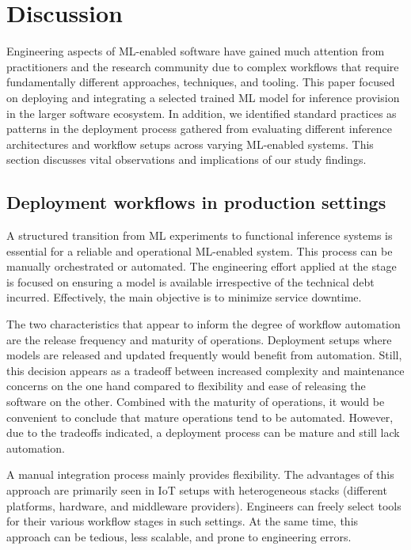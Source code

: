 \section{Discussion}
\label{sec: discussion}
Engineering aspects of ML-enabled software have gained much attention from practitioners and the research community due to
complex workflows that require fundamentally different approaches, techniques, and tooling. This paper focused on deploying and integrating a selected trained ML model for inference provision in the larger software ecosystem. In addition, we identified standard practices as patterns in the deployment process gathered from evaluating different inference architectures and workflow setups across varying ML-enabled systems. This section discusses vital observations and implications of our study findings.


\subsection{Deployment workflows in production settings}

A structured transition from ML experiments to functional inference systems is essential for a reliable and operational ML-enabled system. This process can be manually orchestrated or automated. The engineering effort applied at the \DIFdelbegin {}\DIFdelend \DIFaddbegin {}\DIFaddend stage is focused on ensuring a model is available irrespective of the technical debt incurred. Effectively, the main objective is to minimize service downtime.

The two characteristics that appear to inform the degree of workflow automation are the release frequency and maturity of operations. Deployment setups where models are released and updated frequently would benefit from automation. Still, this decision appears as a tradeoff between increased complexity and maintenance concerns on the one hand compared to flexibility and ease of releasing the software on the other. Combined with the maturity of operations, it would be convenient to conclude that mature operations tend to be automated. However, due to the tradeoffs indicated, a deployment process can be mature and still lack automation.

A manual integration process mainly provides flexibility. The advantages of this approach are primarily seen in IoT setups with heterogeneous stacks (different platforms, hardware, and middleware providers). Engineers can freely select tools for their various workflow stages in such settings. At the same time, this approach can be tedious, less scalable, and prone to engineering errors.

